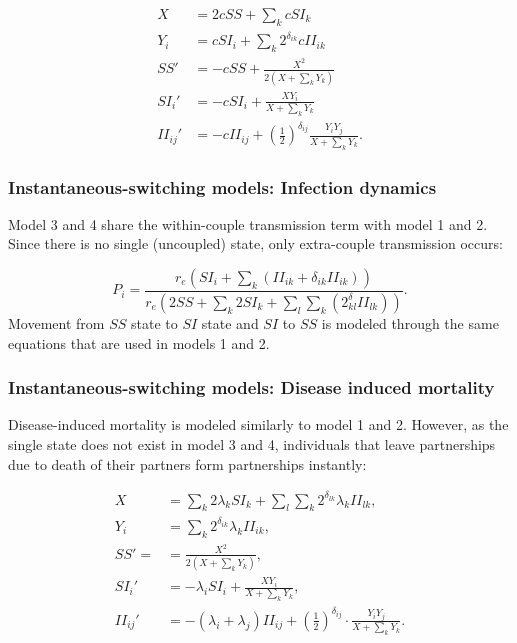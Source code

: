 \documentclass[10pt,letterpaper]{article}
\newcommand{\khalf}{\left(\frac{1}{2}\right)^{\delta_{ij}}}  %
\begin{document}
\begin{equation}
\begin{aligned}
X &= 2 c SS + \sum_k c SI_k \\
Y_i &= c SI_i + \sum_k 2^{\delta_{ik}} c II_{ik} \\
SS' &= - c SS + \frac{X^2}{2 (X + \sum_k Y_k)}\\
SI_i' &= - c SI_i + \frac{X Y_i}{X + \sum_k Y_k}\\
II_{ij}' &= - c II_{ij} +\khalf \frac{Y_i Y_j}{X + \sum_k Y_k}.
\end{aligned}
\end{equation}

\subsubsection*{Instantaneous-switching models: Infection dynamics}

Model 3 and 4 share the within-couple transmission term with model 1 and 2. Since there is no single (uncoupled) state, only extra-couple transmission occurs:

\begin{equation}
P_i = \frac{r_e (SI_i + \sum_k (II_{ik} + \delta_{ik} II_{ik}))}{r_e(2 SS + \sum_k 2 SI_k + \sum_l \sum_k (2^\delta_{kl} II_{lk}) )}.
\end{equation}
Movement from $SS$ state to $SI$ state and $SI$ to $SS$ is modeled through the same equations that are used in models 1 and 2.

\subsubsection*{Instantaneous-switching models: Disease induced mortality}

Disease-induced mortality is modeled similarly to model 1 and 2. However, as the single state does not exist in model 3 and 4, individuals that leave partnerships due to death of their partners form partnerships instantly:

\begin{equation}
\begin{aligned}
X &= \sum_k 2 \lambda_k SI_k + \sum_l \sum_k 2^{\delta_{lk}}  \lambda_k II_{lk}, \\
Y_i &=  \sum_k  2^{\delta_{ik}}  \lambda_k II_{ik}, \\
SS' = &= \frac{X^2}{2 (X + \sum_k Y_k)},\\
SI_i' &= - \lambda_i SI_i + \frac{X Y_i}{X + \sum_k Y_k},\\
II_{ij}' &= -(\lambda_i + \lambda_j) II_{ij} + \khalf \cdot \frac{Y_i Y_j}{X + \sum_k Y_k}.
\end{aligned}
\end{equation}
\end{document}
